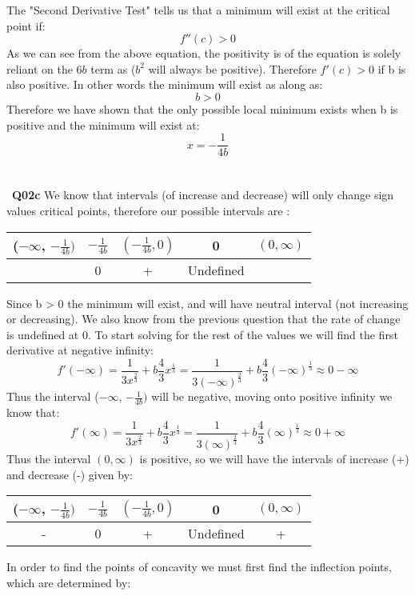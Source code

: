 \documentclass[11pt]{article}
\begin{document}
The "Second Derivative Test" tells us that a minimum will exist at the critical point if:
\[ f''(c) > 0 \]
As we can see from the above equation, the positivity is of the equation is solely reliant on the $6b$ term as ($b^2$ will always be positive). Therefore $f'(c) > 0$ if b is also positive. In other words the minimum will exist as along as:
\[ b > 0 \]
Therefore we have shown that the only possible local minimum exists when b is positive and the minimum will exist at:
\[ x= -\frac{1}{4b} \]
\\\\\
\textbf{Q02c} We know that intervals (of increase and decrease) will only change sign values critical points, therefore our possible intervals are :
\begin{center}
 \begin{tabular}{||c c c c c||} 
 \hline
 ($-\infty$, $-\frac{1}{4b})$ & $-\frac{1}{4b}$ & $(-\frac{1}{4b}, 0)$ & 0 & $(0,\infty)$  \\ [0.5ex] 
 \hline\hline
& 0 & + & Undefined &\\ 
 \hline
\end{tabular}
\end{center}
Since b > 0 the minimum will exist, and will have neutral interval (not increasing or decreasing). We also know from the previous question that the rate of change is undefined at 0. To start solving for the rest of the values we will find the first derivative at negative infinity:
\[ f'(-\infty) =  \frac{1}{3x^{\frac{2}{3}}} + b\frac{4}{3}x^{\frac{1}{3}} = \frac{1}{3(-\infty)^{\frac{2}{3}}} + b\frac{4}{3}(-\infty)^{\frac{1}{3}} \approx 0 -\infty  \]
Thus the interval ($-\infty$, $-\frac{1}{4b})$ will be negative, moving onto positive infinity we know that:
\[ f'(\infty) =  \frac{1}{3x^{\frac{2}{3}}} + b\frac{4}{3}x^{\frac{1}{3}} = \frac{1}{3(\infty)^{\frac{2}{3}}} + b\frac{4}{3}(\infty)^{\frac{1}{3}} \approx 0 + \infty  \]
Thus the interval $(0,\infty)$ is positive, so we will have the intervals of increase (+) and decrease (-) given by:
\begin{center}
 \begin{tabular}{||c c c c c||} 
 \hline
 ($-\infty$, $-\frac{1}{4b})$ & $-\frac{1}{4b}$ & $(-\frac{1}{4b}, 0)$ & 0 & $(0,\infty)$  \\ [0.5ex] 
 \hline\hline
- & 0 & + & Undefined & +\\ 
 \hline
\end{tabular}
\end{center}
In order to find the points of concavity we must first find the inflection points, which are determined by:
\end{document}
